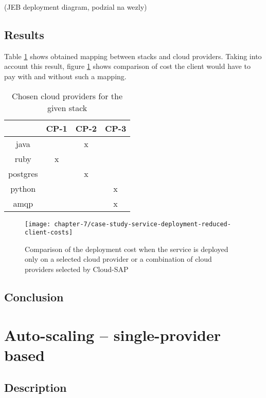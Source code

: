 (JEB deployment diagram, podzial na wezly)

\subsection*{Results}
Table \ref{tbl:test-service-deployment-cost-mapping} shows obtained mapping between stacks and cloud providers. Taking into account this result, figure \ref{ch7:service-deployment-cost} shows comparison of cost the client would have to pay with and without such a mapping.

\begin{table}
  \centering
  \begin{tabular}{ | c | c | c | c | }
    \hline                        
    & CP-1 & CP-2 & CP-3 \\
    \hline
    java      & & x & \\
    ruby      & x & & \\
    postgres  & & x & \\
    python    & & & x \\
    amqp      & & & x \\
    \hline  
  \end{tabular}
  \caption{Chosen cloud providers for the given stack}
  \label{tbl:test-service-deployment-cost-mapping}
\end{table}

\begin{figure}[!ht]
  \begin{center}
    \texttt{[image: chapter-7/case-study-service-deployment-reduced-client-costs]}
  \end{center}
  \caption{Comparison of the deployment cost when the service is deployed only on a selected cloud provider or a combination of cloud providers selected by Cloud-SAP}
  \label{ch7:service-deployment-cost}
\end{figure}

\subsection*{Conclusion}


\section{Auto-scaling -- single-provider based}
\subsection*{Description}
